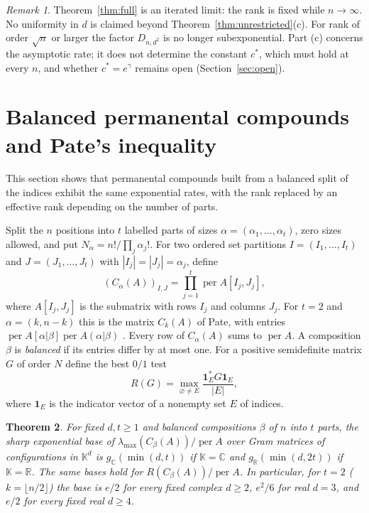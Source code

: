 \documentclass[11pt,a4paper]{article}
\newtheorem{theorem}{Theorem}[section]
\theoremstyle{remark}
\newtheorem{remark}[theorem]{Remark}
\newcommand{\per}{\operatorname{per}}
\newcommand{\C}{\mathbb C}
\newcommand{\R}{\mathbb R}
\newcommand{\K}{\mathbb K}
\begin{document}
\begin{remark}
Theorem~\ref{thm:full} is an iterated limit: the rank is fixed while $n\to\infty$. No uniformity in $d$ is claimed beyond Theorem~\ref{thm:unrestricted}(c). For rank of order $\sqrt n$ or larger the factor $D_{n,d^2}$ is no longer subexponential. Part (c) concerns the asymptotic rate; it does not determine the constant $c^*$, which must hold at every $n$, and whether $c^*=e^\gamma$ remains open (Section~\ref{sec:open}).
\end{remark}

\section{Balanced permanental compounds and Pate's inequality}\label{sec:compounds}
This section shows that permanental compounds built from a balanced split of the indices exhibit the same exponential rates, with the rank replaced by an effective rank depending on the number of parts.

Split the $n$ positions into $t$ labelled parts of sizes $\alpha=(\alpha_1,\dots,\alpha_t)$, zero sizes allowed, and put $N_\alpha=n!/\prod_j\alpha_j!$. For two ordered set partitions $I=(I_1,\dots,I_t)$ and $J=(J_1,\dots,J_t)$ with $|I_j|=|J_j|=\alpha_j$, define
\[
 (C_\alpha(A))_{I,J}=\prod_{j=1}^t\per A[I_j,J_j],
\]
where $A[I_j,J_j]$ is the submatrix with rows $I_j$ and columns $J_j$. For $t=2$ and $\alpha=(k,n-k)$ this is the matrix $C_k(A)$ of Pate, with entries $\per A[\alpha|\beta]\per A(\alpha|\beta)$ \cite[Section~3]{Pate}. Every row of $C_\alpha(A)$ sums to $\per A$. A composition $\beta$ is \emph{balanced} if its entries differ by at most one. For a positive semidefinite matrix $G$ of order $N$ define the best $0/1$ test
\[
 R(G)=\max_{\varnothing\ne E}\frac{\mathbf1_E^*G\mathbf1_E}{|E|},
\]
where $\mathbf 1_E$ is the indicator vector of a nonempty set $E$ of indices.

\begin{theorem}\label{thm:balanced}
For fixed $d,t\ge1$ and balanced compositions $\beta$ of $n$ into $t$ parts, the sharp exponential base of $\lambda_{\max}(C_\beta(A))/\per A$ over Gram matrices of configurations in $\K^d$ is $g_\C(\min(d,t))$ if $\K=\C$ and $g_\R(\min(d,2t))$ if $\K=\R$. The same bases hold for $R(C_\beta(A))/\per A$. In particular, for $t=2$ ($k=\lfloor n/2\rfloor$) the base is $e/2$ for every fixed complex $d\ge2$, $e^2/6$ for real $d=3$, and $e/2$ for every fixed real $d\ge4$.
\end{theorem}
\end{document}
